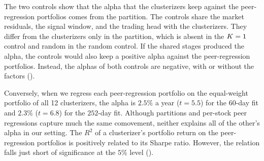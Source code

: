 The two controls show that the alpha that the clusterizers keep against the peer-regression portfolios comes from the partition. The controls share the market residuals, the signal window, and the trading head with the clusterizers. They differ from the clusterizers only in the partition, which is absent in the $K=1$ control and random in the random control. If the shared stages produced the alpha, the controls would also keep a positive alpha against the peer-regression portfolios. Instead, the alphas of both controls are negative, with or without the factors ().

Conversely, when we regress each peer-regression portfolio on the equal-weight portfolio of all 12 clusterizers, the alpha is $2.5\%$ a year ($t = 5.5$) for the $60$-day fit and $2.3\%$ ($t = 6.8$) for the $252$-day fit. Although partitions and per-stock peer regressions capture much the same comovement, neither explains all of the other's alpha in our setting. The $R^2$ of a clusterizer's portfolio return on the peer-regression portfolios is positively related to its Sharpe ratio. However, the relation falls just short of significance at the $5\%$ level ().

